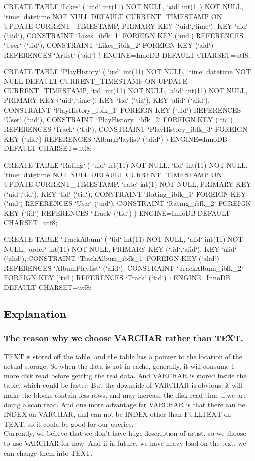 \documentclass[letter, 12pt]{report}
\begin{document}
\begin{spverbatim}
	CREATE TABLE `Likes` (
	`uid` int(11) NOT NULL,
	`aid` int(11) NOT NULL,
	`time` datetime NOT NULL DEFAULT CURRENT_TIMESTAMP ON UPDATE CURRENT_TIMESTAMP,
	PRIMARY KEY (`uid`,`time`),
	KEY `aid` (`aid`),
	CONSTRAINT `Likes_ibfk_1` FOREIGN KEY (`uid`) REFERENCES `User` (`uid`),
	CONSTRAINT `Likes_ibfk_2` FOREIGN KEY (`aid`) REFERENCES `Artist` (`aid`)
	) ENGINE=InnoDB DEFAULT CHARSET=utf8;
	
	CREATE TABLE `PlayHistory` (
	`uid` int(11) NOT NULL,
	`time` datetime NOT NULL DEFAULT CURRENT_TIMESTAMP ON UPDATE CURRENT_TIMESTAMP,
	`tid` int(11) NOT NULL,
	`alid` int(11) NOT NULL,
	PRIMARY KEY (`uid`,`time`),
	KEY `tid` (`tid`),
	KEY `alid` (`alid`),
	CONSTRAINT `PlayHistory_ibfk_1` FOREIGN KEY (`uid`) REFERENCES `User` (`uid`),
	CONSTRAINT `PlayHistory_ibfk_2` FOREIGN KEY (`tid`) REFERENCES `Track` (`tid`),
	CONSTRAINT `PlayHistory_ibfk_3` FOREIGN KEY (`alid`) REFERENCES `AlbumPlaylist` (`alid`)
	) ENGINE=InnoDB DEFAULT CHARSET=utf8;
	
	CREATE TABLE `Rating` (
	`uid` int(11) NOT NULL,
	`tid` int(11) NOT NULL,
	`time` datetime NOT NULL DEFAULT CURRENT_TIMESTAMP ON UPDATE CURRENT_TIMESTAMP,
	`rate` int(1) NOT NULL,
	PRIMARY KEY (`uid`,`tid`),
	KEY `tid` (`tid`),
	CONSTRAINT `Rating_ibfk_1` FOREIGN KEY (`uid`) REFERENCES `User` (`uid`),
	CONSTRAINT `Rating_ibfk_2` FOREIGN KEY (`tid`) REFERENCES `Track` (`tid`)
	) ENGINE=InnoDB DEFAULT CHARSET=utf8;
	
	CREATE TABLE `TrackAlbum` (
	`tid` int(11) NOT NULL,
	`alid` int(11) NOT NULL,
	`order` int(11) NOT NULL,
	PRIMARY KEY (`tid`,`alid`),
	KEY `alid` (`alid`),
	CONSTRAINT `TrackAlbum_ibfk_1` FOREIGN KEY (`alid`) REFERENCES `AlbumPlaylist` (`alid`),
	CONSTRAINT `TrackAlbum_ibfk_2` FOREIGN KEY (`tid`) REFERENCES `Track` (`tid`)
	) ENGINE=InnoDB DEFAULT CHARSET=utf8;
	\end{spverbatim}
	\subsection{Explanation}
	\subsubsection{The reason why we choose VARCHAR rather than TEXT.}
	TEXT is stored off the table, and the table has a pointer to the location of the actual storage. So when the data is not in cache, generally, it will consume 1 more disk read before getting the real data. And VARCHAR is stored inside the table, which could be faster. But the downside of VARCHAR is obvious, it will make the blocks contain less rows, and may increase the disk read time if we are doing a scan read. And one more advantage for VARCHAR is that there can be INDEX on VARCHAR, and can not be INDEX other than FULLTEXT on TEXT, so it could be good for our queries.\\
	Currently, we believe that we don't have huge description of artist, so we choose to use VARCHAR for now. And if in future, we have heavy load on the text, we can change them into TEXT.
	
\end{document}

